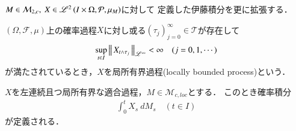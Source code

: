 	$M \in \mathcal{M}_{2,c},\ X \in \mathscr{L}^{2} \left(I \times \Omega,\mathcal{P},\mu_M\right)$に対して
	定義した伊藤積分を更に拡張する．
	
	\begin{screen}
		\begin{dfn}[局所有界過程]
			$(\Omega,\mathcal{F},\mu)$上の確率過程$X$に対し或る$(\tau_j)_{j=0}^{\infty} \in \mathcal{T}$が存在して
			\begin{align}
				\operatorname*{sup}_{t \in I} \left\|\, X_{t \wedge \tau_j}\, \right\|_{\mathscr{L}^\infty} < \infty
				\quad (j=0,1,\cdots)
			\end{align}
			が満たされているとき，$X$を局所有界過程(locally bounded process)という．
		\end{dfn}
	\end{screen}
	
	\begin{screen}
		\begin{thm}[局所マルチンゲールと左連続局所有界適合過程に対する伊藤積分]
			$X$を左連続且つ局所有界な適合過程，$M \in \mathcal{M}_{c,loc}$とする．
			このとき確率積分
			\begin{align}
				\int_0^t X_s\ dM_s \quad (t \in I)
			\end{align}
			が定義される．
		\end{thm}
	\end{screen}
	
